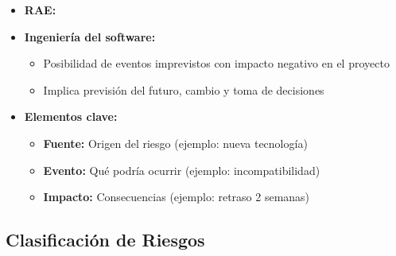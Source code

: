 \begin{itemize}
    \item \textbf{RAE:} 
    \item \textbf{Ingeniería del software:}
    \begin{itemize}
        \item Posibilidad de eventos imprevistos con impacto negativo en el proyecto
        \item Implica previsión del futuro, cambio y toma de decisiones
    \end{itemize}

    \item \textbf{Elementos clave:}
    \begin{itemize}
        \item \textbf{Fuente:} Origen del riesgo (ejemplo: nueva tecnología)
        \item \textbf{Evento:} Qué podría ocurrir (ejemplo: incompatibilidad)
        \item \textbf{Impacto:} Consecuencias (ejemplo: retraso 2 semanas)
    \end{itemize}
\end{itemize}

\subsection{Clasificación de Riesgos}
\label{subsec:clasificacion}

